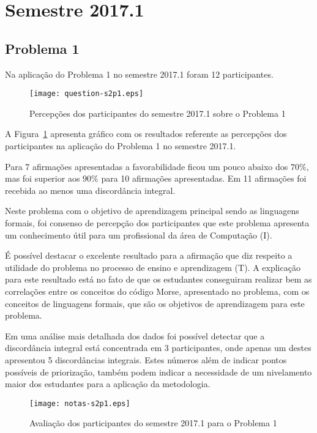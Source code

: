 \section{Semestre 2017.1}
\label{sec-sem-2017}

\subsection{Problema 1}
\label{sec-2017-p1}
Na aplicação do Problema 1 no semestre 2017.1 foram 12 participantes.

\begin{figure}[!htb]
\centering
\texttt{[image: question-s2p1.eps]}
\caption{Percepções dos participantes do semestre 2017.1 sobre o Problema 1}
\label{percep-s2p1}
\end{figure}

A Figura~\ref{percep-s2p1} apresenta gráfico com os resultados referente
as percepções dos participantes na aplicação do
Problema 1 no semestre 2017.1.


Para 7 afirmações apresentadas a favorabilidade ficou um pouco abaixo dos $70\%$, mas
foi superior aos $90\%$ para 10 afirmações apresentadas.
Em 11 afirmações foi recebida ao menos uma discordância integral.

Neste problema com o objetivo de aprendizagem principal sendo
as linguagens formais, foi consenso de percepção dos participantes que
este problema apresenta um conhecimento útil para um profissional
da área de Computação (I).

É possível destacar o excelente resultado para a afirmação que diz respeito a
utilidade do problema no processo de ensino e aprendizagem (T).
A explicação para este resultado está no fato de que os estudantes
conseguiram realizar bem as correlações entre os conceitos
do código Morse, apresentado no problema, com os conceitos de
linguagens formais, que são os objetivos de aprendizagem para
este problema.

Em uma análise mais detalhada dos dados foi possível
detectar que a discordância integral está concentrada
em 3 participantes, onde apenas um destes apresentou
5 discordâncias integrais.
Estes números além de indicar pontos possíveis de
priorização, também podem indicar a necessidade
de um nivelamento maior dos estudantes para a aplicação
da metodologia.

\begin{figure}[!htb]
\centering
\texttt{[image: notas-s2p1.eps]}
\caption{Avaliação dos participantes do semestre 2017.1 para o Problema 1}
\label{aval-s2p1}
\end{figure}


